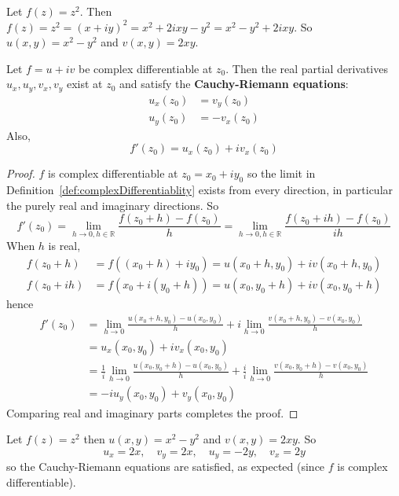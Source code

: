 \begin{example}
	Let $f(z) = z^2$. Then $f(z) = z^2 = {(x + iy)}^2 = x^2 + 2ixy - y^2 = x^2 - y^2 + 2ixy$. So $u(x, y) = x^2 - y^2$ and $v(x, y) = 2xy$.
\end{example}

\begin{proposition}\label{prop:cauchyRiemann}
	Let $f = u + iv$ be complex differentiable at $z_0$. Then the real partial derivatives $u_x, u_y, v_x, v_y$ exist at $z_0$ and satisfy the \textbf{Cauchy-Riemann equations}:
	\[
		\begin{aligned}
			u_x(z_0) & = v_y(z_0) \\
			u_y(z_0) & = -v_x(z_0)
		\end{aligned}
	\]
	Also,
	\[
		f'(z_0) = u_x(z_0) + i v_x(z_0)
	\]
\end{proposition}

\begin{proof}
	$f$ is complex differentiable at $z_0 = x_0 + i y_0$ so the limit in Definition~\ref{def:complexDifferentiablity} exists from every direction, in particular the purely real and imaginary directions. So
	\[
		f'(z_0) = \lim_{h \to 0, h \in \mathbb{R}} \frac{f(z_0 + h) - f(z_0)}{h} = \lim_{h \to 0, h \in \mathbb{R}} \frac{f(z_0 + ih) - f(z_0)}{ih}
	\]
	When $h$ is real,
	\[
		\begin{aligned}
			f(z_0 + h) & = f((x_0 + h) + iy_0) = u(x_0 + h, y_0) + i v(x_0 + h, y_0) \\
			f(z_0 + ih) & = f(x_0 + i(y_0 + h)) = u(x_0, y_0 + h) + i v(x_0, y_0 + h)
		\end{aligned}
	\]
	hence
	\[
		\begin{aligned}
			f'(z_0) & = \lim_{h \to 0} \frac{u(x_0 + h, y_0) - u(x_0, y_0)}{h} + i \lim_{h \to 0} \frac{v(x_0 + h, y_0) - v(x_0, y_0)}{h} \\
			& = u_x(x_0, y_0) + i v_x(x_0, y_0) \\
			& = \frac{1}{i} \lim_{h \to 0} \frac{u(x_0, y_0 + h) - u(x_0, y_0)}{h} + \frac{i}{i} \lim_{h \to 0} \frac{v(x_0, y_0 + h) - v(x_0, y_0)}{h} \\
			& = -i u_y(x_0, y_0) + v_y(x_0, y_0)
		\end{aligned}
	\]
	Comparing real and imaginary parts completes the proof.
\end{proof}

\begin{example}
	Let $f(z) = z^2$ then $u(x, y) = x^2 - y^2$ and $v(x, y) = 2xy$. So
	\[
		u_x = 2x, \quad v_y = 2x, \quad u_y = -2y, \quad v_x = 2y
	\]
	so the Cauchy-Riemann equations are satisfied, as expected (since $f$ is complex differentiable).
\end{example}

